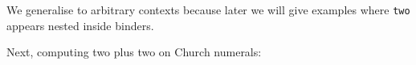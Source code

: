 We generalise to arbitrary contexts because later we will give examples
where \texttt{two} appears nested inside binders.

Next, computing two plus two on Church numerals:

\begin{fence}
\begin{code}%
\>[0]\AgdaSpace{}%
\AgdaSymbol{:}\AgdaSpace{}%
\AgdaSpace{}%
\AgdaSpace{}%
\<%
\\
\>[0]\AgdaSpace{}%
%
\>[6]\AgdaSymbol{=}%
\>[9]\AgdaSymbol{(}\AgdaSpace{}%
\AgdaSpace{}%
\AgdaSymbol{)}\AgdaSpace{}%
\AgdaSpace{}%
\AgdaSpace{}%
\AgdaSpace{}%
\<%
\\
%
\\[\AgdaEmptyExtraSkip]%
\>[0]\AgdaSpace{}%
\AgdaSymbol{:}\AgdaSpace{}%
\AgdaSpace{}%
\AgdaSymbol{\{}\AgdaSpace{}%
\AgdaSymbol{\}}\AgdaSpace{}%
\AgdaSpace{}%
\AgdaSpace{}%
\AgdaSpace{}%
\AgdaSpace{}%
\<%
\\
\>[0]\AgdaSpace{}%
\AgdaSymbol{=}\AgdaSpace{}%
\AgdaSpace{}%
\AgdaSpace{}%
\AgdaSymbol{(}\AgdaOperator{\AgdaFunction{\#}}\AgdaSpace{}%
\AgdaSpace{}%
\AgdaSpace{}%
\AgdaSymbol{(}\AgdaOperator{\AgdaFunction{\#}}\AgdaSpace{}%
\AgdaSpace{}%
\AgdaSpace{}%
\AgdaOperator{\AgdaFunction{\#}}\AgdaSpace{}%
\AgdaSymbol{))}\<%
\\
%
\\[\AgdaEmptyExtraSkip]%
\>[0]\AgdaSpace{}%
\AgdaSymbol{:}\AgdaSpace{}%
\AgdaSpace{}%
\AgdaSymbol{\{}\AgdaSpace{}%
\AgdaSymbol{\}}\AgdaSpace{}%
\AgdaSpace{}%
\AgdaSpace{}%
\AgdaSpace{}%
\AgdaSpace{}%
\AgdaSpace{}%
\AgdaSpace{}%
\AgdaSpace{}%
\AgdaSpace{}%
\AgdaSpace{}%
\AgdaSpace{}%

\end{code}
\end{fence}
